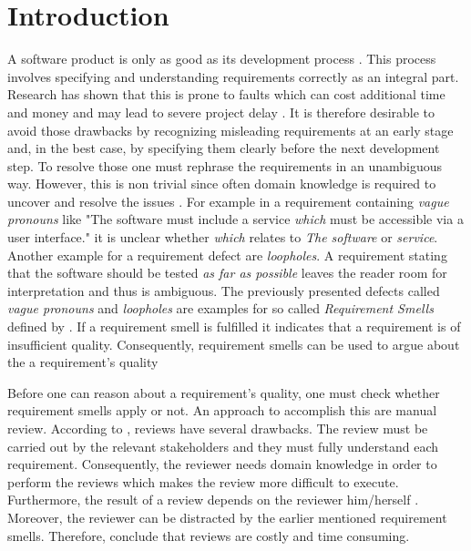 
\chapter{Introduction}
\label{chapter:introduction}

A software product is only as good as its development process \parencite{Hsia:1993}.
This process involves specifying and understanding requirements correctly as an integral part.
Research has shown that this is prone to faults which can cost additional time and money \parencite{Mendez:2006} and may lead to severe project delay \parencite{Femmer:2014}.
It is therefore desirable to avoid those drawbacks by recognizing misleading requirements at an early stage and, in the best case, by specifying them clearly before the next development step.
To resolve those one must rephrase the requirements in an unambiguous way.
However, this is non trivial since often domain knowledge is required to uncover and resolve the issues \parencite{Femmer:2017}.
For example in a requirement containing \textit{vague pronouns} like "The software must include a service \textit{which} must be accessible via a user interface." it is unclear whether \textit{which} relates to \textit{The software} or \textit{service}.
Another example for a requirement defect are \textit{loopholes}.
A requirement stating that the software should be tested \textit{as far as possible} leaves the reader room for interpretation and thus is ambiguous.
The previously presented defects called \textit{vague pronouns} and \textit{loopholes} are examples for so called \textit{Requirement Smells} defined by \textcite{Femmer:2017}.
If a requirement smell is fulfilled it indicates that a requirement is of insufficient quality.
Consequently, requirement smells can be used to argue about the a requirement's quality

Before one can reason about a requirement's quality, one must check whether requirement smells apply or not.
An approach to accomplish this are manual review.
According to \textcite{Salger:2013}, reviews have several drawbacks.
The review must be carried out by the relevant stakeholders and they must fully understand each requirement.
Consequently, the reviewer needs domain knowledge in order to perform the reviews which makes the review more difficult to execute.
Furthermore, the result of a review depends on the reviewer him/herself \parencite{Zelkowitz:1983}.
Moreover, the reviewer can be distracted by the earlier mentioned requirement smells.
Therefore, \textcite{Femmer:2017} conclude that reviews are costly and time consuming.

